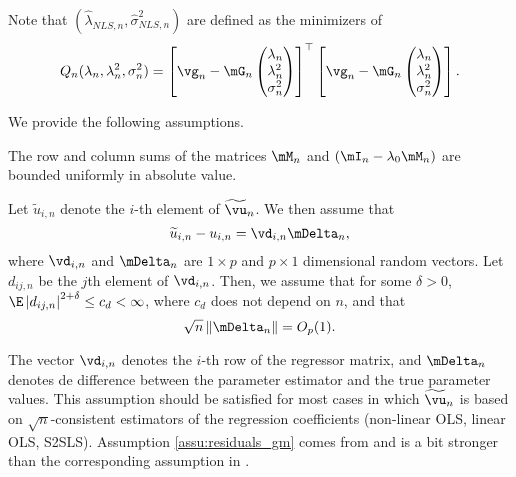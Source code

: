 Note that $(\widehat{\lambda}_{NLS, n}, \widehat{\sigma}^2_{NLS, n})$ are defined as the minimizers of
\begin{equation}\label{eq:Qn-sem-mom}
Q_n(\lambda_n, \lambda^2_n, \sigma^2_n) = \left[\vg_n - \mG_n \begin{pmatrix}\lambda_n \\ \lambda ^2_n \\ \sigma^2_n\end{pmatrix}\right]^\top \left[\vg_n - \mG_n \begin{pmatrix}\lambda _n\\ \lambda ^2_n \\ \sigma^2_n\end{pmatrix}\right].
\end{equation}

We provide the following assumptions. 
\begin{assumption}\label{assu:bounded_matrix_M}
The row and column sums of the matrices $\mM_n$ and $(\mI_n - \lambda_0\mM_n)$ are bounded uniformly in absolute value.
\end{assumption}

\begin{assumption}\label{assu:residuals_gm}
Let $\widetilde{u}_{i, n}$ denote the $i$-th element of $\widetilde{\vu}_n$. We then assume that
\begin{equation*}
\widetilde{u}_{i, n} - u_{i,n} = \vd_{i,n}\mDelta_n, 
\end{equation*}
%
where $\vd_{i, n}$ and $\mDelta_n$ are $1\times p$ and $p\times 1$ dimensional random vectors. Let $d_{ij,n}$ be the $j$th element of $\vd_{i, n}$. Then, we assume that for some $\delta>0$, $\E\left|d_{ij,n}\right|^{2 + \delta}\leq c_{d} < \infty$, where $c_d$ does not depend on $n$, and that
\begin{equation}
\sqrt{n}\left\lVert \mDelta_n\right\rVert = O_p(1).
\end{equation}
\end{assumption}

The vector $\vd_{i, n}$ denotes the $i$-th row of the regressor matrix, and $\mDelta_n$ denotes de difference between the parameter estimator and the true parameter values. This assumption should be satisfied for most cases in which $\widetilde{\vu}_n$ is based on $\sqrt{n}$-consistent estimators of the regression coefficients (non-linear OLS, linear OLS, S2SLS). Assumption \ref{assu:residuals_gm} comes from \cite{kelejian2010specification} and is a bit stronger than the corresponding assumption in \cite{kelejian1999generalized}.



